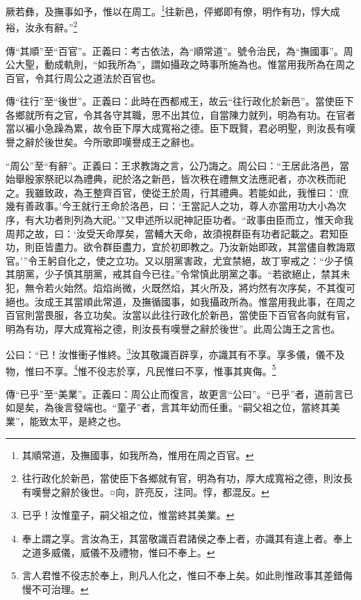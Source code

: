 厥若彝，及撫事如予，惟以在周工。\footnote{其順常道，及撫國事，如我所為，惟用在周之百官。}往新邑，伻鄉即有僚，明作有功，惇大成裕，汝永有辭。”\footnote{往行政化於新邑，當使臣下各鄉就有官，明為有功，厚大成寬裕之德，則汝長有嘆譽之辭於後世。○向，許亮反，注同。惇，都混反。}

{\noindent\zhuan{}\fzbyks 傳“其順”至“百官”。正義曰：考古依法，為“順常道”。號令治民，為“撫國事”。周公大聖，動成軌則，“如我所為”，謂如攝政之時事所施為也。惟當用我所為在周之百官，令其行周公之道法於百官也。 \par}

{\noindent\zhuan{}\fzbyks 傳“往行”至“後世”。正義曰：此時在西都戒王，故云“往行政化於新邑”。當使臣下各鄉就所有之官，令其各守其職，思不出其位，自當陳力就列，明為有功。在官者當以褊小急躁為累，故令臣下厚大成寬裕之德。臣下既賢，君必明聖，則汝長有嘆譽之辭於後世矣。今所歌即嘆譽成王之辭也。 \par}

{\noindent\shu{}\fzkt “周公”至“有辭”。正義曰：王求教誨之言，公乃誨之。周公曰：“王居此洛邑，當始舉殷家祭祀以為禮典，祀於洛之新邑，皆次秩在禮無文法應祀者，亦次秩而祀之。我雖致政，為王整齊百官，使從王於周，行其禮典。若能如此，我惟曰：‘庶幾有善政事。’今王就行王命於洛邑，曰：‘王當記人之功，尊人亦當用功大小為次序，有大功者則列為大祀。’”又申述所以祀神記臣功者。“政事由臣而立，惟天命我周邦之故，曰：‘汝受天命厚矣，當輔大天命，故須視群臣有功者記載之。君知臣功，則臣皆盡力。欲令群臣盡力，宜於初即教之。乃汝新始即政，其當儘自教誨眾官。’”令王躬自化之，使之立功。又以朋黨害政，尤宜禁絕，故丁寧戒之：“少子慎其朋黨，少子慎其朋黨，戒其自今已往。”令常慎此朋黨之事。“若欲絕止，禁其未犯，無令若火始然。焰焰尚微，火既然焰，其火所及，將灼然有次序矣，不其復可絕也。汝成王其當順此常道，及撫循國事，如我攝政所為。惟當用我此事，在周之百官則當畏服，各立功矣。汝當以此往行政化於新邑，當使臣下百官各向就有官，明為有功，厚大成寬裕之德，則汝長有嘆譽之辭於後世”。此周公誨王之言也。 \par}

公曰：“已！汝惟衝子惟終。\footnote{已乎！汝惟童子，嗣父祖之位，惟當終其美業。}汝其敬識百辟享，亦識其有不享。享多儀，儀不及物，惟曰不享。\footnote{奉上謂之享。言汝為王，其當敬識百君諸侯之奉上者，亦識其有違上者。奉上之道多威儀，威儀不及禮物，惟曰不奉上。}惟不役志於享，凡民惟曰不享，惟事其爽侮。\footnote{言人君惟不役志於奉上，則凡人化之，惟曰不奉上矣。如此則惟政事其差錯侮慢不可治理。}


{\noindent\zhuan{}\fzbyks 傳“已乎”至“美業”。正義曰：周公止而復言，故更言“公曰”。“已乎”者，道前言已如是矣，為後言發端也。“童子”者，言其年幼而任重。“嗣父祖之位，當終其美業”，能致太平，是終之也。 \par}

